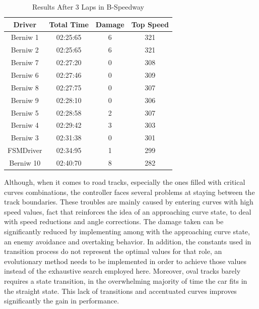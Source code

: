 \begin{table}[h]
\renewcommand{\arraystretch}{1.3}
\caption{Results After 3 Laps in B-Speedway}
\label{table_results_B}
\centering
\begin{tabular}{c||c||c||c}
\hline
\bfseries Driver & \bfseries Total Time & \bfseries Damage & \bfseries Top Speed \\ 
\hline
\hline Berniw 1 & 02:25:65 & 6 & 321 \\
\hline Berniw 2 & 02:25:65 & 6 & 321 \\
\hline Berniw 7 & 02:27:20 & 0 & 308 \\
\hline Berniw 6 & 02:27:46 & 0 & 309 \\
\hline Berniw 8 & 02:27:75 & 0 & 307 \\
\hline Berniw 9 & 02:28:10 & 0 & 306 \\
\hline Berniw 5 & 02:28:58 & 2 & 307 \\
\hline Berniw 4 & 02:29:42 & 3 & 303 \\
\hline Berniw 3 & 02:31:38 & 0 & 301 \\
\hline FSMDriver & 02:34:95 & 1 & 299 \\ 
\hline Berniw 10 & 02:40:70 & 8 & 282 \\ 
\hline 
\end{tabular}
\end{table}


Although, when it comes to road tracks, especially the ones filled with critical curves combinations, the controller faces several problems at staying between the track boundaries. These troubles are mainly caused by entering curves with high speed values, fact that reinforces the idea of an approaching curve state, to deal with speed reductions and angle corrections. The damage taken can be significantly reduced by implementing among with the approaching curve state, an enemy avoidance and overtaking behavior. In addition, the constants used in transition process do not represent the optimal values for that role, an evolutionary method needs to be implemented in order to achieve those values instead of the exhaustive search employed here. Moreover, oval tracks barely requires a state transition, in the overwhelming majority of time the car fits in the straight state. This lack of transitions and accentuated curves improves significantly the gain in performance.

